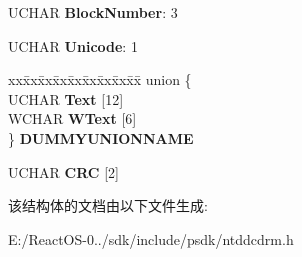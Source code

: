 \begin{DoxyCompactItemize}
U\+C\+H\+AR {\bfseries Block\+Number}\+: 3
\item 
\mbox{\label{struct___c_d_r_o_m___t_o_c___c_d___t_e_x_t___d_a_t_a___b_l_o_c_k_a438d65e53705433b9a07307a93c165c9}} 
U\+C\+H\+AR {\bfseries Unicode}\+: 1
\item 
\mbox{\label{struct___c_d_r_o_m___t_o_c___c_d___t_e_x_t___d_a_t_a___b_l_o_c_k_a9f11c9e49da7858675742001fac9b9b5}} 
\begin{tabbing}
xx\=xx\=xx\=xx\=xx\=xx\=xx\=xx\=xx\=\kill
union \{\\
\>UCHAR {\bfseries Text} \mbox{[}12\mbox{]}\\
\>WCHAR {\bfseries WText} \mbox{[}6\mbox{]}\\
\} {\bfseries DUMMYUNIONNAME}\\

\end{tabbing}\item 
\mbox{\label{struct___c_d_r_o_m___t_o_c___c_d___t_e_x_t___d_a_t_a___b_l_o_c_k_a3ec910616b3f999eae42e043fc5f5dab}} 
U\+C\+H\+AR {\bfseries C\+RC} \mbox{[}2\mbox{]}
\end{DoxyCompactItemize}


该结构体的文档由以下文件生成\+:\begin{DoxyCompactItemize}
\item 
E\+:/\+React\+O\+S-\/0../sdk/include/psdk/ntddcdrm.\+h\end{DoxyCompactItemize}

